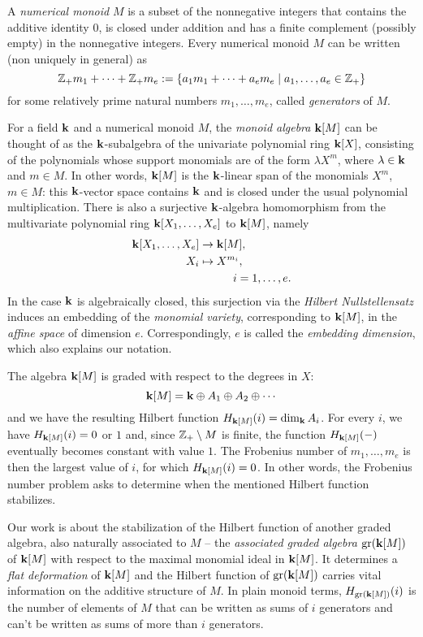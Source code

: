 \begin{introduction}
A \emph{numerical monoid} $M$ is a subset of the nonnegative integers that contains the additive identity $0$, is closed under addition and has a finite complement (possibly empty) in the nonnegative integers. Every numerical monoid $M$ can be written (non uniquely in general) as
\[
	\mathbb{Z}_+ m_1 + \cdots + \mathbb{Z}_+ m_e := \{a_1m_1 + \cdots + a_em_e \mid a_1, \ldots ,a_e \in \mathbb{Z}_+\}
\]
for some relatively prime natural numbers $m_1,\ldots,m_e$, called \emph{generators} of $M$.

For a field $\mathbf{k}$ and a numerical monoid $M$, the \emph{monoid algebra} $\mathbf{k}[M]$ can be thought of as the $\mathbf{k}$-subalgebra of the univariate polynomial ring $\mathbf{k}[X]$, consisting of the polynomials whose support monomials are of the form $\lambda X^m$, where $\lambda\in\mathbf{k}$ and $m\in M$. In other words, $\mathbf{k}[M]$ is the $\mathbf{k}$-linear span of the monomials $X^m$, $m\in M$: this $\mathbf{k}$-vector space contains $\mathbf{k}$ and is closed under the usual polynomial multiplication. There is also a surjective $\mathbf{k}$-algebra homomorphism from the multivariate polynomial ring $\mathbf{k}[X_1,\ldots,X_e]$ to $\mathbf{k}[M]$, namely
\begin{align*}
\mathbf{k}[X_1,\ldots,X_e]&\to\mathbf{k}[M],\\
X_i&\mapsto X^{m_i},\\
&\qquad\quad i=1,\ldots,e.
\end{align*}
In the case $\mathbf{k}$ is algebraically closed, this surjection via the \emph{Hilbert Nullstellensatz} induces an embedding of the \emph{monomial variety}, corresponding to $\mathbf{k}[M]$, in the \emph{affine space} of dimension $e$. Correspondingly, $e$ is called the \emph{embedding dimension}, which also explains our notation.

The algebra $\mathbf{k}[M]$ is graded with respect to the degrees in $X$:
$$
\mathbf{k}[M]=\mathbf{k} \oplus A_1\oplus A_2\oplus\cdots
$$
and we have the resulting Hilbert function $H_{\mathbf{k}[M]}(i)=\dim_{\mathbf{k}} A_i$. For every $i$, we have $H_{\mathbf{k}[M]}(i)=0$ or $1$ and, since $\mathbb Z_+\setminus M$ is finite, the function $H_{\mathbf{k}[M]}(-)$ eventually becomes constant with value $1$. The Frobenius number of $m_1,\ldots,m_e$ is then the largest value of $i$, for which $H_{\mathbf{k}[M]}(i)=0$. In other words, the Frobenius number problem asks to determine when the mentioned Hilbert function stabilizes.

Our work is about the stabilization of the Hilbert function of another graded algebra, also naturally associated to $M$ -- the \emph{associated graded algebra} $\operatorname{gr}(\mathbf{k}[M])$ of $\mathbf{k}[M]$ with respect to the maximal monomial ideal in $\mathbf{k}[M]$. It determines a \emph{flat deformation} of $\mathbf{k}[M]$ and the Hilbert function of $\operatorname{gr}(\mathbf{k}[M])$ carries vital information on the additive structure of $M$. In plain monoid terms, $H_{\operatorname{gr}(\mathbf{k}[M])}(i)$ is the number of elements of $M$ that can be written as sums of $i$ generators and can't be written as sums of more than $i$ generators. 


\end{introduction}
